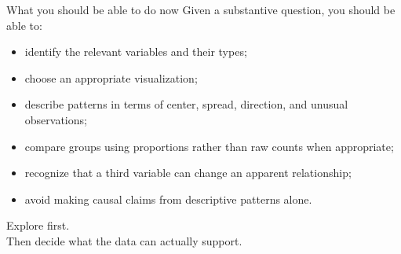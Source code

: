 \documentclass[11pt,aspectratio=169]{beamer}
\begin{document}
\begin{frame}{What you should be able to do now}
Given a substantive question, you should be able to:

\begin{itemize}
  \item identify the relevant variables and their types;
  \item choose an appropriate visualization;
  \item describe patterns in terms of center, spread, direction, and unusual observations;
  \item compare groups using proportions rather than raw counts when appropriate;
  \item recognize that a third variable can change an apparent relationship;
  \item avoid making causal claims from descriptive patterns alone.
\end{itemize}
\end{frame}

\begin{frame}[standout]
\Large Explore first.\\[0.4em]
\normalsize Then decide what the data can actually support.
\end{frame}
\end{document}
